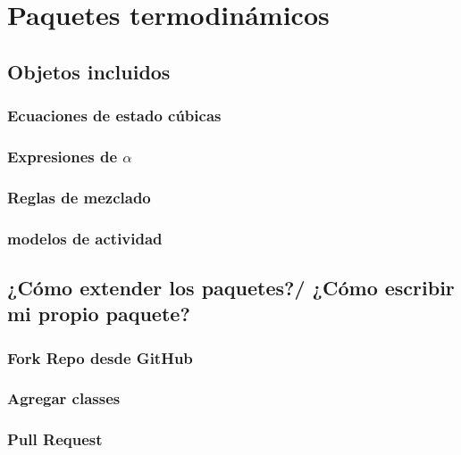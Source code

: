 \chapter{Paquetes termodinámicos}
	\section{Objetos incluidos}
		\subsection{Ecuaciones de estado cúbicas}
		\subsection{Expresiones de $\alpha$}
		\subsection{Reglas de mezclado}
		\subsection{modelos de actividad}
	\section{¿Cómo extender los paquetes?/ ¿Cómo escribir mi propio paquete?}
		\subsection{Fork Repo desde GitHub}
		\subsection{Agregar classes}
		\subsection{Pull Request}
